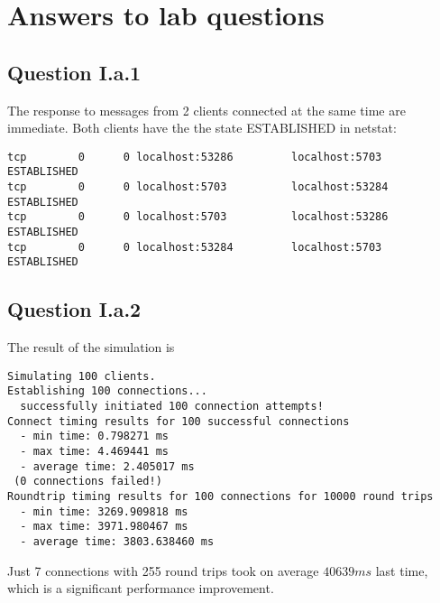 

\def \nazovUlohy{Lab 3 - Improving the flawed server}
\def \skola{\textbf{Chalmers university - Computer science}}
\def \tema{Homework from computer networks}
\def \author{\textbf{Michal Šustr}, \textbf{Arnaud D'Artigues}}
\def \email{\href{mailto:michal.sustr@gmail.com}{\texttt{michal.sustr@gmail.com}} \\ \href{mailto:arnaud.dartigues@gmail.com}{\texttt{arnaud.dartigues@gmail.com}}}
\def \date{13. 10. 2014}







\section{Answers to lab questions}
\subsection*{Question I.a.1}
The response to messages from 2 clients connected at the same time are immediate. Both clients have the the state ESTABLISHED in netstat:
\begin{verbatim}
tcp        0      0 localhost:53286         localhost:5703          ESTABLISHED
tcp        0      0 localhost:5703          localhost:53284         ESTABLISHED
tcp        0      0 localhost:5703          localhost:53286         ESTABLISHED
tcp        0      0 localhost:53284         localhost:5703          ESTABLISHED
\end{verbatim}

\subsection*{Question I.a.2}
The result of the simulation is 
\begin{verbatim}
Simulating 100 clients.
Establishing 100 connections... 
  successfully initiated 100 connection attempts!
Connect timing results for 100 successful connections
  - min time: 0.798271 ms
  - max time: 4.469441 ms
  - average time: 2.405017 ms
 (0 connections failed!)
Roundtrip timing results for 100 connections for 10000 round trips
  - min time: 3269.909818 ms
  - max time: 3971.980467 ms
  - average time: 3803.638460 ms
\end{verbatim}

Just 7 connections with 255 round trips took on average $40639ms$ last time, which is a significant performance improvement.

